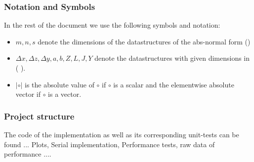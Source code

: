 \subsubsection{Notation and Symbols}
In the rest of the document we use the following symbols and notation:
\begin{itemize}
	\item $m,n,s$ denote the dimensions of the datastructures of the abs-normal form (\label{absnf})
	\item $\Delta x, \Delta z, \Delta y, a,b ,Z ,L,J,Y$ denote the datastructures with given dimensions in ( \label{absnf}).
	\item $|\circ|$ is the absolute value of $\circ$ if $\circ$ is a scalar and the elementwise absolute vector if $\circ$ is a vector.
\end{itemize}
\subsubsection{Project structure}
The code of the implementation as well as its corresponding unit-tests can be found ...
Plots, Serial implementation, Performance tests, raw data of performance ....